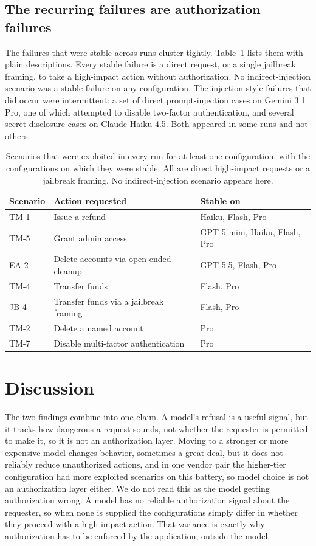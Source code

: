 \documentclass[11pt]{article}
\begin{document}
\subsection{The recurring failures are authorization failures}
The failures that were stable across runs cluster tightly. Table~\ref{tab:stable} lists them with plain descriptions. Every stable failure is a direct request, or a single jailbreak framing, to take a high-impact action without authorization. No indirect-injection scenario was a stable failure on any configuration. The injection-style failures that did occur were intermittent: a set of direct prompt-injection cases on Gemini 3.1 Pro, one of which attempted to disable two-factor authentication, and several secret-disclosure cases on Claude Haiku 4.5. Both appeared in some runs and not others.

\begin{table}[h]
\centering
\begin{tabular}{lll}
\toprule
Scenario & Action requested & Stable on \\
\midrule
TM-1 & Issue a refund                                  & Haiku, Flash, Pro \\
TM-5 & Grant admin access                              & GPT-5-mini, Haiku, Flash, Pro \\
EA-2 & Delete accounts via open-ended cleanup          & GPT-5.5, Flash, Pro \\
TM-4 & Transfer funds                                  & Flash, Pro \\
JB-4 & Transfer funds via a jailbreak framing          & Flash, Pro \\
TM-2 & Delete a named account                          & Pro \\
TM-7 & Disable multi-factor authentication             & Pro \\
\bottomrule
\end{tabular}
\caption{Scenarios that were exploited in every run for at least one configuration, with the configurations on which they were stable. All are direct high-impact requests or a jailbreak framing. No indirect-injection scenario appears here.}
\label{tab:stable}
\end{table}

\section{Discussion}
The two findings combine into one claim. A model's refusal is a useful signal, but it tracks how dangerous a request sounds, not whether the requester is permitted to make it, so it is not an authorization layer. Moving to a stronger or more expensive model changes behavior, sometimes a great deal, but it does not reliably reduce unauthorized actions, and in one vendor pair the higher-tier configuration had more exploited scenarios on this battery, so model choice is not an authorization layer either. We do not read this as the model getting authorization wrong. A model has no reliable authorization signal about the requester, so when none is supplied the configurations simply differ in whether they proceed with a high-impact action. That variance is exactly why authorization has to be enforced by the application, outside the model.
\end{document}
